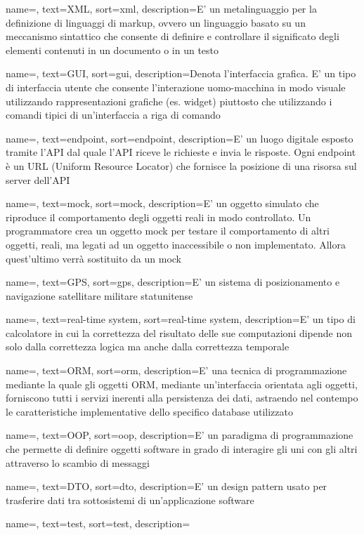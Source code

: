 {
    name=,
    text=XML,
    sort=xml,
    description={E' un metalinguaggio per la definizione di linguaggi di markup, ovvero un linguaggio basato su un meccanismo sintattico che consente di definire e controllare il significato degli elementi contenuti in un documento o in un testo}
}

{
    name=,
    text=GUI,
    sort=gui,
    description={Denota l'interfaccia grafica. E' un tipo di interfaccia utente che consente l'interazione uomo-macchina in modo visuale utilizzando rappresentazioni grafiche (es. widget) piuttosto che utilizzando i comandi tipici di un'interfaccia a riga di comando}
}

{
    name=,
    text=endpoint,
    sort=endpoint,
    description={E' un luogo digitale esposto tramite l'API dal quale l'API riceve le richieste e invia le risposte. Ogni endpoint è un URL (Uniform Resource Locator) che fornisce la posizione di una risorsa sul server dell'API}
}

{
    name=,
    text=mock,
    sort=mock,
    description={E' un oggetto simulato che riproduce il comportamento degli oggetti reali in modo controllato. Un programmatore crea un oggetto mock per testare il comportamento di altri oggetti, reali, ma legati ad un oggetto inaccessibile o non implementato. Allora quest'ultimo verrà sostituito da un mock}
}

{
    name=,
    text=GPS,
    sort=gps,
    description={E' un sistema di posizionamento e navigazione satellitare militare statunitense}
}

{
    name=,
    text=real-time system,
    sort=real-time system,
    description={E' un tipo di calcolatore in cui la correttezza del risultato delle sue computazioni dipende non solo dalla correttezza logica ma anche dalla correttezza temporale}
}

{
    name=,
    text=ORM,
    sort=orm,
    description={E' una tecnica di programmazione mediante la quale gli oggetti ORM, mediante un'interfaccia orientata agli oggetti, forniscono tutti i servizi inerenti alla persistenza dei dati, astraendo nel contempo le caratteristiche implementative dello specifico database utilizzato}
}

{
    name=,
    text=OOP,
    sort=oop,
    description={E' un paradigma di programmazione che permette di definire oggetti software in grado di interagire gli uni con gli altri attraverso lo scambio di messaggi}
}

{
    name=,
    text=DTO,
    sort=dto,
    description={E' un design pattern usato per trasferire dati tra sottosistemi di un'applicazione software}
}

{
    name=,
    text=test,
    sort=test,
    description={}
}